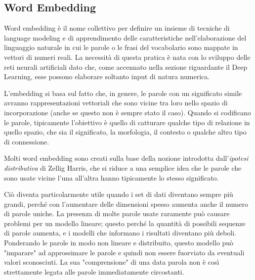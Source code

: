 \subsection{Word Embedding}
Word embedding è il nome collettivo per definire un insieme di tecniche di language modeling e di apprendimento delle caratteristiche nell'elaborazione del linguaggio naturale in cui le parole o le frasi del vocabolario sono mappate in vettori di numeri reali. La necessità di questa pratica è nata con lo sviluppo delle reti neurali artificiali dato che, come accennato nella sezione riguardante il Deep Learning, esse possono elaborare soltanto input di natura numerica.

L'embedding si basa sul fatto che, in genere, le parole con un significato simile avranno rappresentazioni vettoriali che sono vicine tra loro nello spazio di incorporazione (anche se questo non è sempre stato il caso). Quando si codificano le parole, tipicamente l'obiettivo è quello di catturare qualche tipo di relazione in quello spazio, che sia il significato, la morfologia, il contesto o qualche altro tipo di connessione.

Molti word embedding sono creati sulla base della nozione introdotta dall'\textit{ipotesi distributiva} di Zellig Harris\textsuperscript{\cite{distributional_structure}}, che si riduce a una semplice idea che le parole che sono usate vicine l'una all'altra hanno tipicamente lo stesso significato.

Ciò diventa particolarmente utile quando i set di dati diventano sempre più grandi, perché con l’aumentare delle dimensioni spesso aumenta anche il numero di parole uniche. La presenza di molte parole usate raramente può causare problemi per un modello lineare; questo perché la quantità di possibili sequenze di parole aumenta, e i modelli che informano i risultati diventano più deboli. Ponderando le parole in modo non lineare e distribuito, questo modello può "imparare" ad approssimare le parole e quindi non essere fuorviato da eventuali valori sconosciuti. La sua "comprensione" di una data parola non è così strettamente legata alle parole immediatamente circostanti.
